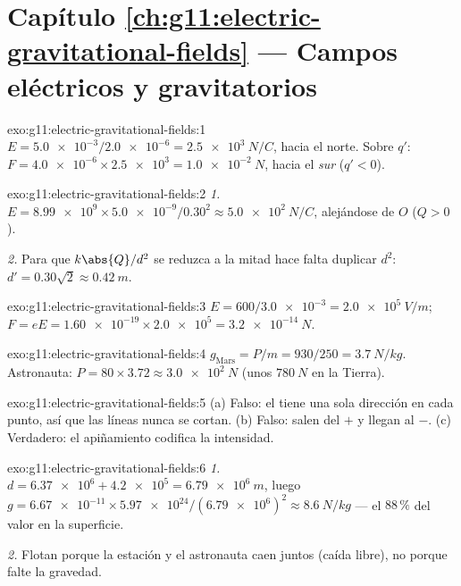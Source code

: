 \section*{Capítulo \ref{ch:g11:electric-gravitational-fields} --- Campos eléctricos y gravitatorios}

\begin{solution}{exo:g11:electric-gravitational-fields:1}
$E = \num{5.0e-3} / \num{2.0e-6} = \qty{2.5e3}{N/C}$, hacia el norte.
Sobre $q'$: $F = \num{4.0e-6} \times \num{2.5e3} = \qty{1.0e-2}{N}$,
hacia el \emph{sur} ($q' < 0$).
\end{solution}

\begin{solution}{exo:g11:electric-gravitational-fields:2}
\emph{1.} $E = \num{8.99e9} \times \num{5.0e-9} / 0.30^2
\approx \qty{5.0e2}{N/C}$, alejándose de $O$ ($Q > 0$).

\emph{2.} Para que $k\abs{Q}/d^2$ se reduzca a la mitad hace falta
duplicar $d^2$: $d' = 0.30\sqrt{2} \approx \qty{0.42}{m}$.
\end{solution}

\begin{solution}{exo:g11:electric-gravitational-fields:3}
$E = 600 / \num{3.0e-3} = \qty{2.0e5}{V/m}$;
$F = eE = \num{1.60e-19} \times \num{2.0e5} = \qty{3.2e-14}{N}$.
\end{solution}

\begin{solution}{exo:g11:electric-gravitational-fields:4}
$g_{\text{Mars}} = P/m = 930/250 = \qty{3.7}{N/kg}$. Astronauta:
$P = 80 \times 3.72 \approx \qty{3.0e2}{N}$ (unos $\qty{780}{N}$ en la
Tierra).
\end{solution}

\begin{solution}{exo:g11:electric-gravitational-fields:5}
(a) Falso: el  tiene una sola dirección en cada punto, así que las
líneas nunca se cortan. (b) Falso: salen del $+$ y llegan al $-$. (c)
Verdadero: el apiñamiento codifica la intensidad.
\end{solution}

\begin{solution}{exo:g11:electric-gravitational-fields:6}
\emph{1.} $d = \num{6.37e6} + \num{4.2e5} = \qty{6.79e6}{m}$, luego
$g = \num{6.67e-11} \times \num{5.97e24} / (\num{6.79e6})^2
\approx \qty{8.6}{N/kg}$ --- el $88\,\%$ del valor en la superficie.

\emph{2.} Flotan porque la estación y el astronauta caen juntos (caída
libre), no porque falte la gravedad.
\end{solution}

